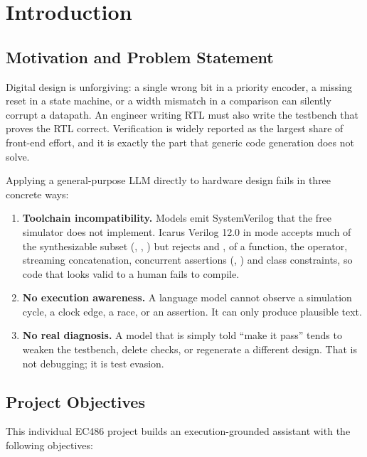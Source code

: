 \chapter{Introduction}
\label{sec:intro}

\section{Motivation and Problem Statement}
Digital design is unforgiving: a single wrong bit in a priority encoder, a missing
reset in a state machine, or a width mismatch in a comparison can silently corrupt a
datapath. An engineer writing RTL must also write the testbench that proves the RTL
correct. Verification is widely reported as the largest share of front-end effort,
and it is exactly the part that generic code generation does not solve.

Applying a general-purpose LLM directly to hardware design fails in three concrete
ways:

\begin{enumerate}[label=\textbf{\arabic*.}]
\item \textbf{Toolchain incompatibility.} Models emit SystemVerilog that the free
simulator does not implement. Icarus Verilog 12.0 in  mode accepts much of
the synthesizable subset (, , ) but rejects
 and ,  of a function, the 
operator, streaming concatenation, concurrent assertions (,
) and class constraints, so code that looks valid to a human fails to
compile.
\item \textbf{No execution awareness.} A language model cannot observe a simulation
cycle, a clock edge, a race, or an assertion. It can only produce plausible text.
\item \textbf{No real diagnosis.} A model that is simply told ``make it pass'' tends
to weaken the testbench, delete checks, or regenerate a different design. That is
not debugging; it is test evasion.
\end{enumerate}

\section{Project Objectives}
This individual EC486 project builds an execution-grounded assistant with the
following objectives:

